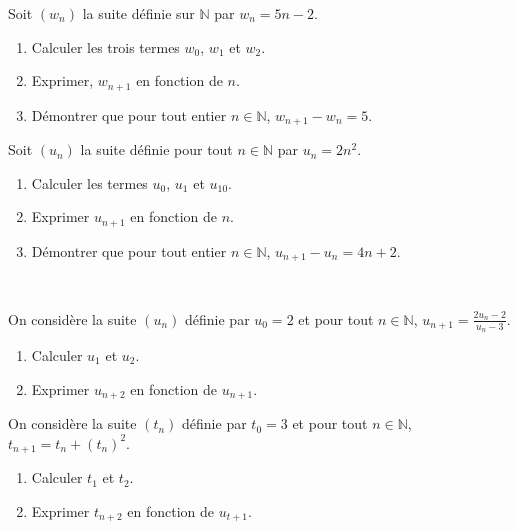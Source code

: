\documentclass[11pt]{article}
\begin{document}
\noindent\begin{minipage}[]{.48\textwidth}
\begin{exo}
  Soit $(w_n)$ la suite définie sur $\mathbb{N}$ par $w_n = 5n - 2$.
\begin{enumerate}
    \item Calculer les trois termes $w_0$, $w_1$ et $w_2$.
    \item Exprimer, $w_{n+1}$ en fonction de $n$.
    \item Démontrer que pour tout entier $n \in \mathbb{N}$, $w_{n+1} - w_n = 5$.
\end{enumerate}
\end{exo}
\end{minipage}
\hfill
\begin{minipage}[]{.48\textwidth}
\begin{exo}
  Soit $(u_n)$ la suite définie pour tout $n \in \mathbb{N}$ par $u_n = 2n^2$.
\begin{enumerate}
    \item Calculer les termes $u_0$, $u_1$ et $u_{10}$.
    \item Exprimer $u_{n+1}$ en fonction de $n$.
    \item Démontrer que pour tout entier $n \in \mathbb{N}$, $u_{n+1} - u_n = 4n
      + 2$.
\end{enumerate}
\end{exo}
\end{minipage}
~\vspace{.5cm}

\noindent\begin{minipage}[]{.48\textwidth}
\begin{exo}
  On considère la suite $(u_n)$ définie par $u_0=2$ et pour tout
  $n\in\mathbb{N}$, $u_{n+1}=\frac{2u_n-2}{u_n-3}$.
  \begin{enumerate}
    \item Calculer $u_1$ et $u_2$.
    \item Exprimer $u_{n+2}$ en fonction de $u_{n+1}$.
  \end{enumerate}
\end{exo}
\end{minipage}
\hfill
\begin{minipage}[]{.48\textwidth}
\begin{exo}
  On considère la suite $(t_n)$ définie par $t_0=3$ et pour tout
  $n\in\mathbb{N}$, $t_{n+1}=t_n+\left( t_n \right)^2$.
  \begin{enumerate}
    \item Calculer $t_1$ et $t_2$.
    \item Exprimer $t_{n+2}$ en fonction de $u_{t+1}$.
  \end{enumerate}
\end{exo}
\end{minipage}
\end{document}
